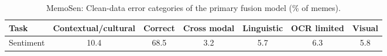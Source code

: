 \begin{table}[t]
\centering
\small
\caption{MemoSen: Clean-data error categories of the primary fusion model (\% of memes).}
\label{tab:clean_error_table_memosen}
\begin{adjustbox}{max width=\columnwidth}
\begin{tabular}{lcccccc}
\toprule
Task & Contextual/cultural & Correct & Cross modal & Linguistic & OCR limited & Visual \\
\midrule
Sentiment & 10.4 & 68.5 & 3.2 & 5.7 & 6.3 & 5.8 \\
\bottomrule
\end{tabular}
\end{adjustbox}
\end{table}
